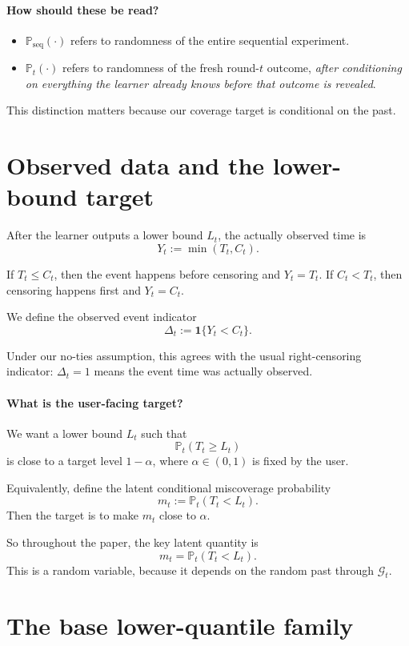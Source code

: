 \documentclass[11pt]{article}
\newcommand{\Prob}{\mathbb{P}}
\newcommand{\1}{\mathbf{1}}
\newcommand{\seq}{\mathrm{seq}}
\newcommand{\cG}{\mathcal{G}}
\begin{document}
\paragraph{How should these be read?}
\begin{itemize}[leftmargin=*,itemsep=2pt]
  \item $\Prob_{\seq}(\cdot)$ refers to randomness of the entire sequential experiment.
  \item $\Prob_t(\cdot)$ refers to randomness of the fresh round-$t$ outcome, \emph{after conditioning on everything the learner already knows before that outcome is revealed}. 
\end{itemize}

This distinction matters because our coverage target is conditional on the past.

\section{Observed data and the lower-bound target}

After the learner outputs a lower bound $L_t$, the actually observed time is
\[
Y_t:=\min(T_t,C_t).
\]

If $T_t\le C_t$, then the event happens before censoring and $Y_t=T_t$. If $C_t<T_t$, then censoring happens first and $Y_t=C_t$.

We define the observed event indicator
\[
\Delta_t:=\1\{Y_t<C_t\}.
\]

Under our no-ties assumption, this agrees with the usual right-censoring indicator: $\Delta_t=1$ means the event time was actually observed.

\paragraph{What is the user-facing target?}
We want a lower bound $L_t$ such that
\[
\Prob_t(T_t\ge L_t)
\]
is close to a target level $1-\alpha$, where $\alpha\in(0,1)$ is fixed by the user.

Equivalently, define the latent conditional miscoverage probability
\[
m_t:=\Prob_t(T_t< L_t).
\]
Then the target is to make $m_t$ close to $\alpha$.

So throughout the paper, the key latent quantity is
\[
m_t=\Prob_t(T_t< L_t).
\]
This is a random variable, because it depends on the random past through $\cG_t$.

\section{The base lower-quantile family}
\end{document}
